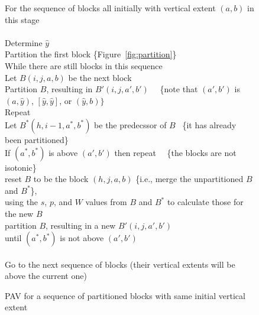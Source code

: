 \documentclass[11pt]{article}
\newlength{\Ainlength}
\newlength{\Aintemp}
\newcommand{\Ain}[1]{\setlength{\Aintemp}{0.5in}\addtolength{\Aintemp}{#1\Ainlength} \hspace*{\Aintemp}}
\begin{document}
\begin{figure}
\noindent
For the sequence of blocks all initially with vertical extent $(a,b)$ in this stage\\
 \\
\Ain{0} Determine $\hat{y}$\\
\Ain{0} Partition the first block \{Figure~\ref{fig:partition}\}\\
\Ain{0} While there are still blocks in this sequence\\
     \Ain{1} Let $B(i,j,a,b)$ be the next block\\
     \Ain{1} Partition $B$, resulting in $B'(i,j,a',b')$~~ \{note that $(a',b')$ is $(a,\hat{y})$, $[\hat{y},\hat{y}]$, or $(\hat{y},b)\}$\\
     \Ain{2} Repeat\\
            \Ain{3} Let $B^*(h,i\!-\!1,a^*,b^*)$ be the predecssor of $B$~ \{it has already been partitioned\}\\
            \Ain{3}  If $(a^*,b^*)$ is above $(a',b')$ then repeat~~ \{the blocks are not isotonic\}\\
               \Ain{4}  reset $B$ to be the block $(h,j,a,b)$ \{i.e., merge the unpartitioned $B$ and $B^*$\},\\
              \Ain{5}  using the $s$, $p$, and $W$ values from $B$ and $B^*$ to calculate those for the new $B$\\
              \Ain{4}  partition $B$, resulting in a new $B'(i,j,a',b')$\\
           \Ain{3} until $(a^*,b^*)$ is not above $(a',b')$\\
 \\
Go to the next sequence of blocks (their vertical extents will be above the current one)

\caption{PAV for a sequence of partitioned blocks with same initial vertical extent}  \label{fig:PAVcode}

\hrulefill
\end{figure}
\end{document}
